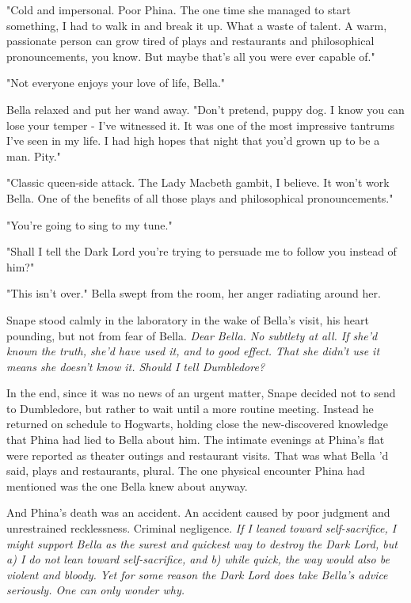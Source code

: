 "Cold and impersonal. Poor Phina. The one time she managed to start something, I had to walk in and break it up. What a waste of talent. A warm, passionate person can grow tired of plays and restaurants and philosophical pronouncements, you know. But maybe that's all you were ever capable of."

"Not everyone enjoys your love of life, Bella."

Bella relaxed and put her wand away. "Don't pretend, puppy dog. I know you can lose your temper - I've witnessed it. It was one of the most impressive tantrums I've seen in my life. I had high hopes that night that you'd grown up to be a man. Pity."

"Classic queen-side attack. The Lady Macbeth gambit, I believe. It won't work Bella. One of the benefits of all those plays and philosophical pronouncements."

"You're going to sing to my tune."

"Shall I tell the Dark Lord you're trying to persuade me to follow you instead of him?"

"This isn't over." Bella swept from the room, her anger radiating around her.

Snape stood calmly in the laboratory in the wake of Bella's visit, his heart pounding, but not from fear of Bella. \emph{Dear Bella. No subtlety at all. If she'd known the truth, she'd have used it, and to good effect. That she didn't use it means she doesn't know it. Should I tell Dumbledore?}

In the end, since it was no news of an urgent matter, Snape decided not to send to Dumbledore, but rather to wait until a more routine meeting. Instead he returned on schedule to Hogwarts, holding close the new-discovered knowledge that Phina had lied to Bella about him. The intimate evenings at Phina's flat were reported as theater outings and restaurant visits. That was what Bella 'd said, plays and restaurants, plural. The one physical encounter Phina had mentioned was the one Bella knew about anyway.

And Phina's death was an accident. An accident caused by poor judgment and unrestrained recklessness. Criminal negligence. \emph{If I leaned toward self-sacrifice, I might support Bella as the surest and quickest way to destroy the Dark Lord, but a) I do not lean toward self-sacrifice, and b) while quick, the way would also be violent and bloody. Yet for some reason the Dark Lord does take Bella's advice seriously. One can only wonder why.}


